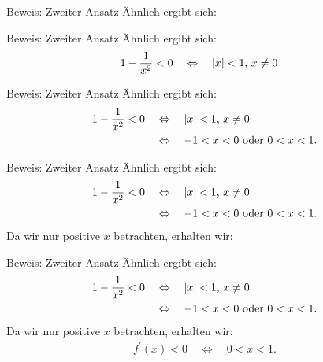 \documentclass[10pt]{beamer}
\begin{document}
\begin{frame}{Beweis: Zweiter Ansatz}
    Ähnlich ergibt sich:
\end{frame}



\begin{frame}{Beweis: Zweiter Ansatz}
    Ähnlich ergibt sich: 
    \begin{align*}
        1 - \frac{1}{x^{2}} < 0
        \quad & \Leftrightarrow \quad \text{\( \left\vert x \right\vert < 1 \), \( x \neq 0 \)}
    \end{align*}
\end{frame}



\begin{frame}{Beweis: Zweiter Ansatz}
    Ähnlich ergibt sich: 
    \begin{align*}
        1 - \frac{1}{x^{2}} < 0
        \quad & \Leftrightarrow \quad \text{\( \left\vert x \right\vert < 1 \), \( x \neq 0 \)} \\
        \quad & \Leftrightarrow \quad \text{\( -1 < x < 0 \) oder \( 0 < x < 1 \)}.
    \end{align*}
\end{frame}



\begin{frame}{Beweis: Zweiter Ansatz}
    Ähnlich ergibt sich: 
    \begin{align*}
        1 - \frac{1}{x^{2}} < 0
        \quad & \Leftrightarrow \quad \text{\( \left\vert x \right\vert < 1 \), \( x \neq 0 \)} \\
        \quad & \Leftrightarrow \quad \text{\( -1 < x < 0 \) oder \( 0 < x < 1 \)}.
    \end{align*}
    Da wir nur positive \( x \) betrachten, erhalten wir: 
\end{frame}



\begin{frame}{Beweis: Zweiter Ansatz}
    Ähnlich ergibt sich: 
    \begin{align*}
        1 - \frac{1}{x^{2}} < 0
        \quad & \Leftrightarrow \quad \text{\( \left\vert x \right\vert < 1 \), \( x \neq 0 \)} \\
        \quad & \Leftrightarrow \quad \text{\( -1 < x < 0 \) oder \( 0 < x < 1 \)}.
    \end{align*}
    Da wir nur positive \( x \) betrachten, erhalten wir:
    \begin{align*}
        f^{\prime}( x ) < 0 \quad \Leftrightarrow \quad 0 < x < 1.
    \end{align*}
\end{frame}
\end{document}
